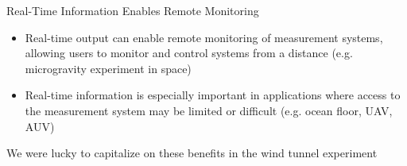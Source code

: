 \begin{frame}[label=why-10]{Real-Time Information Enables Remote Monitoring}

\begin{itemize}
\item Real-time output can enable remote monitoring of measurement systems, allowing users to monitor and control systems from a distance (e.g. microgravity experiment in space)
\item Real-time information is especially important in applications where access to the measurement system may be limited or difficult (e.g. ocean floor, UAV, AUV)
\end{itemize}

\end{frame}




\begin{frame}[label=why-12]{We were lucky to capitalize on these benefits in the wind tunnel experiment}
\begin{columns}
\end{columns}
\end{frame}


